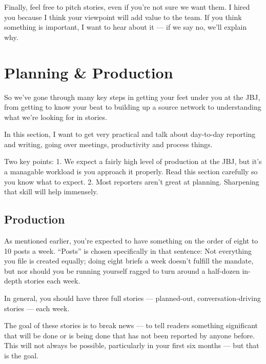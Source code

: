 \documentclass[
  11pt,
  american,
  letterpaperpaper,
  extrafontsizes,onecolumn,openright
  ]{memoir}
\begin{document}
Finally, feel free to pitch stories, even if you're not sure we want them. I hired you because I think your viewpoint will add value to the team. If you think something is important, I want to hear about it --- if we say no, we'll explain why.

\hypertarget{planning-production}{%
\chapter{Planning \& Production}\label{planning-production}}

So we've gone through many key steps in getting your feet under you at the JBJ, from getting to know your beat to building up a source network to understanding what we're looking for in stories.

In this section, I want to get very practical and talk about day-to-day reporting and writing, going over meetings, productivity and process things.

\leavevmode{}%
\begin{greybox}[frametitle=Onboarding Path]
Two key points: 1. We expect a fairly high level of production at the JBJ, but it's a managable workload is you approach it properly. Read this section carefully so you know what to expect. 2. Most reporters aren't great at planning. Sharpening that skill will help immensely.

\end{greybox}

\hypertarget{production}{%
\section*{Production}\label{production}}

As mentioned earlier, you're expected to have something on the order of eight to 10 posts a week. \enquote{Posts} is chosen specifically in that sentence: Not everything you file is created equally; doing eight briefs a week doesn't fulfill the mandate, but nor should you be running yourself ragged to turn around a half-dozen in-depth stories each week.

In general, you should have three full stories --- planned-out, conversation-driving stories --- each week.

The goal of these stories is to break news --- to tell readers something significant that will be done or is being done that has not been reported by anyone before. This will not always be possible, particularly in your first six months --- but that is the goal.
\end{document}
